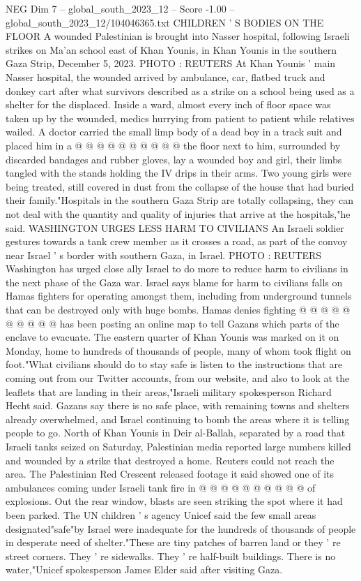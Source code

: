 \begin{textsample}{NEG Dim 7 – global\_south\_2023\_12 – Score -1.00 – global\_south\_2023\_12/104046365.txt}
CHILDREN ' S BODIES ON THE FLOOR A wounded Palestinian is brought into Nasser hospital, following Israeli strikes on Ma'an school east of Khan Younis, in Khan Younis in the southern Gaza Strip, December 5, 2023.
PHOTO : REUTERS At Khan Younis ' main Nasser hospital, the wounded arrived by ambulance, car, flatbed truck and donkey cart after what survivors described as a strike on a school being used as a shelter for the displaced.
Inside a ward, almost every inch of floor space was taken up by the wounded, medics hurrying from patient to patient while relatives wailed.
A doctor carried the small limp body of a dead boy in a track suit and placed him in a @ @ @ @ @ @ @ @ @ @ the floor next to him, surrounded by discarded bandages and rubber gloves, lay a wounded boy and girl, their limbs tangled with the stands holding the IV drips in their arms.
Two young girls were being treated, still covered in dust from the collapse of the house that had buried their family."Hospitals in the southern Gaza Strip are totally collapsing, they can not deal with the quantity and quality of injuries that arrive at the hospitals,"he said.
WASHINGTON URGES LESS HARM TO CIVILIANS An Israeli soldier gestures towards a tank crew member as it crosses a road, as part of the convoy near Israel ' s border with southern Gaza, in Israel.
PHOTO : REUTERS Washington has urged close ally Israel to do more to reduce harm to civilians in the next phase of the Gaza war.
Israel says blame for harm to civilians falls on Hamas fighters for operating amongst them, including from underground tunnels that can be destroyed only with huge bombs.
Hamas denies fighting @ @ @ @ @ @ @ @ @ @ has been posting an online map to tell Gazans which parts of the enclave to evacuate.
The eastern quarter of Khan Younis was marked on it on Monday, home to hundreds of thousands of people, many of whom took flight on foot."What civilians should do to stay safe is listen to the instructions that are coming out from our Twitter accounts, from our website, and also to look at the leaflets that are landing in their areas,"Israeli military spokesperson Richard Hecht said.
Gazans say there is no safe place, with remaining towns and shelters already overwhelmed, and Israel continuing to bomb the areas where it is telling people to go.
North of Khan Younis in Deir al-Ballah, separated by a road that Israeli tanks seized on Saturday, Palestinian media reported large numbers killed and wounded by a strike that destroyed a home.
Reuters could not reach the area.
The Palestinian Red Crescent released footage it said showed one of its ambulances coming under Israeli tank fire in @ @ @ @ @ @ @ @ @ @ of explosions.
Out the rear window, blasts are seen striking the spot where it had been parked.
The UN children ' s agency Unicef said the few small areas designated"safe"by Israel were inadequate for the hundreds of thousands of people in desperate need of shelter."These are tiny patches of barren land or they ' re street corners.
They ' re sidewalks.
They ' re half-built buildings.
There is no water,"Unicef spokesperson James Elder said after visiting Gaza.

\end{textsample}
